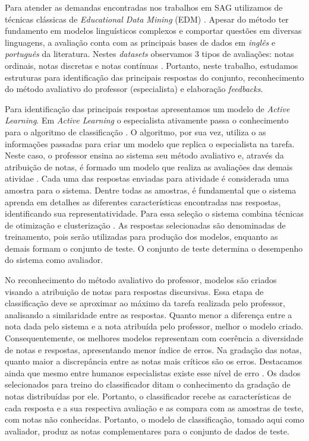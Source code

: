 Para atender as demandas encontradas nos trabalhos em SAG utilizamos de técnicas clássicas de \textit{Educational Data Mining} (EDM) \cite{romero2010}. Apesar do método ter fundamento em modelos linguísticos complexos e comportar questões em diversas linguagens, a avaliação conta com as principais bases de dados em \textit{inglês} e \textit{português} da literatura. Nestes \textit{datasets} observamos 3 tipos de avaliações: notas ordinais, notas discretas e notas contínuas \cite{morettin2010}. Portanto, neste trabalho, estudamos estruturas para identificação das principais respostas do conjunto, reconhecimento do método avaliativo do professor (especialista) e elaboração \textit{feedbacks}.

Para identificação das principais respostas apresentamos um modelo de \textit{Active Learning}. Em \textit{Active Learning} o especialista ativamente passa o conhecimento para o algoritmo de classificação \cite{silva2007, miller2020}. O algoritmo, por sua vez, utiliza o as informações passadas para criar um modelo que replica o especialista na tarefa. Neste caso, o professor ensina ao sistema seu método avaliativo e, através da atribuição de notas, é formado um modelo que realiza as avaliações das demais atividae \cite{romero2010}. Cada uma das respostas enviadas para atividade é considerada uma amostra para o sistema. Dentre todas as amostras, é fundamental que o sistema aprenda em detalhes as diferentes características encontradas nas respostas, identificando sua representatividade. Para essa seleção o sistema combina técnicas de otimização e clusterização \cite{everitt2011, spalenza2019}. As respostas selecionadas são denominadas de treinamento, pois serão utilizadas para produção dos modelos, enquanto as demais formam o conjunto de teste. O conjunto de teste determina o desempenho do sistema como avaliador.

No reconhecimento do método avaliativo do professor, modelos são criados visando a atribuição de notas para respostas discursivas. Essa etapa de classificação deve se aproximar ao máximo da tarefa realizada pelo professor, analisando a similaridade entre as respostas. Quanto menor a diferença entre a nota dada pelo sistema e a nota atribuída pelo professor, melhor o modelo criado. Consequentemente, os melhores modelos representam com coerência a diversidade de notas e respostas, apresentando menor índice de erros. Na gradação das notas, quanto maior a discrepância entre as notas mais críticos são os erros. Destacamos ainda que mesmo entre humanos especialistas existe esse nível de erro \cite{artstein2008, pado2021}. Os dados selecionados para treino do classificador ditam o conhecimento da gradação de notas distribuídas por ele. Portanto, o classificador recebe as características de cada resposta e a sua respectiva avaliação e as compara com as amostras de teste, com notas não conhecidas. Portanto, o modelo de classificação, tomado aqui como avaliador, produz as notas complementares para o conjunto de dados de teste.

